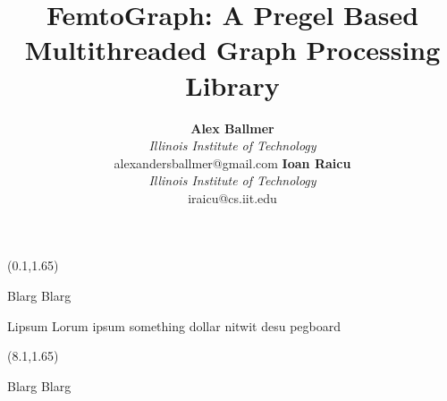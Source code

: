 \documentclass{beamer}
\title{FemtoGraph: A Pregel Based Multithreaded Graph Processing Library}
\author{
  \textbf{Alex Ballmer}\\
  \textit{Illinois Institute of Technology}\\
  alexandersballmer@gmail.com
  \textbf{Ioan Raicu}\\
  \textit{Illinois Institute of Technology}\\
  iraicu@cs.iit.edu
}
\begin{document}
\begin{frame}[t]
\begin{textblock}{7.6}(0.1,1.65)
  \begin{block}{Blarg}
    Blarg
  \end{block}
  \begin{block}{Lipsum}
    Lorum ipsum something dollar nitwit desu pegboard
    \lipsum
  \end{block}
\end{textblock}
\begin{textblock}{7.6}(8.1,1.65)
  \begin{block}{Blarg}
    Blarg
    \lipsum
  \end{block}
\end{textblock}

\end{frame}
\end{document}
